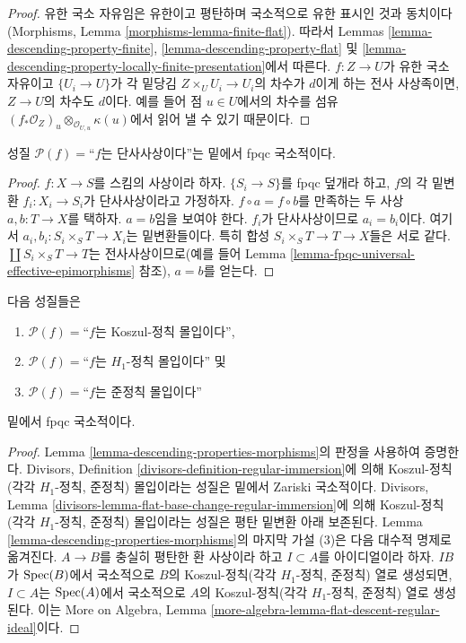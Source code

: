 \begin{proof}
유한 국소 자유임은 유한이고 평탄하며 국소적으로 유한 표시인 것과
동치이다(Morphisms, Lemma \ref{morphisms-lemma-finite-flat}). 따라서
Lemmas \ref{lemma-descending-property-finite},
\ref{lemma-descending-property-flat} 및
\ref{lemma-descending-property-locally-finite-presentation}에서 따른다.
$f : Z \to U$가 유한 국소 자유이고 $\{U_i \to U\}$가 각 밑당김
$Z \times_U U_i \to U_i$의 차수가 $d$이게 하는 전사 사상족이면,
$Z \to U$의 차수도 $d$이다. 예를 들어 점 $u \in U$에서의 차수를 섬유
$(f_*\mathcal{O}_Z)_u \otimes_{\mathcal{O}_{U, u}} \kappa(u)$에서 읽어
낼 수 있기 때문이다.
\end{proof}

\begin{lemma}
\label{lemma-descending-property-monomorphism}
성질 $\mathcal{P}(f) =$“$f$는 단사사상이다”는 밑에서 fpqc 국소적이다.
\end{lemma}

\begin{proof}
$f : X \to S$를 스킴의 사상이라 하자. $\{S_i \to S\}$를 fpqc
덮개라 하고, $f$의 각 밑변환 $f_i : X_i \to S_i$가 단사사상이라고
가정하자. $f \circ a = f \circ b$를 만족하는 두 사상
$a, b : T \to X$를 택하자. $a = b$임을 보여야 한다. $f_i$가
단사사상이므로 $a_i = b_i$이다. 여기서
$a_i, b_i : S_i \times_S T \to X_i$는 밑변환들이다. 특히 합성
$S_i \times_S T \to T \to X$들은 서로 같다.
$\coprod S_i \times_S T \to T$는 전사사상이므로(예를 들어 Lemma
\ref{lemma-fpqc-universal-effective-epimorphisms} 참조), $a = b$를
얻는다.
\end{proof}

\begin{lemma}
\label{lemma-descending-property-regular-immersion}
다음 성질들은
\begin{enumerate}
\item[] $\mathcal{P}(f) =$“$f$는 Koszul-정칙 몰입이다”,
\item[] $\mathcal{P}(f) =$“$f$는 $H_1$-정칙 몰입이다” 및
\item[] $\mathcal{P}(f) =$“$f$는 준정칙 몰입이다”
\end{enumerate}
밑에서 fpqc 국소적이다.
\end{lemma}

\begin{proof}
Lemma \ref{lemma-descending-properties-morphisms}의 판정을 사용하여
증명한다. Divisors, Definition
\ref{divisors-definition-regular-immersion}에 의해 Koszul-정칙(각각
$H_1$-정칙, 준정칙) 몰입이라는 성질은 밑에서 Zariski 국소적이다.
Divisors, Lemma
\ref{divisors-lemma-flat-base-change-regular-immersion}에 의해
Koszul-정칙(각각 $H_1$-정칙, 준정칙) 몰입이라는 성질은 평탄 밑변환 아래
보존된다. Lemma \ref{lemma-descending-properties-morphisms}의 마지막
가설 (3)은 다음 대수적 명제로 옮겨진다. $A \to B$를 충실히 평탄한 환
사상이라 하고 $I \subset A$를 아이디얼이라 하자. $IB$가
$\mathop{\mathrm{Spec}}(B)$에서 국소적으로 $B$의 Koszul-정칙(각각 $H_1$-정칙, 준정칙)
열로 생성되면, $I \subset A$는 $\mathop{\mathrm{Spec}}(A)$에서 국소적으로 $A$의
Koszul-정칙(각각 $H_1$-정칙, 준정칙) 열로 생성된다. 이는 More on Algebra,
Lemma \ref{more-algebra-lemma-flat-descent-regular-ideal}이다.
\end{proof}






